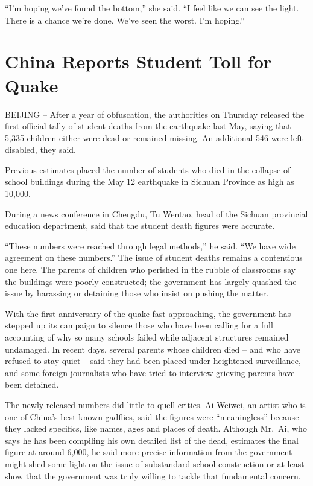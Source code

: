 \documentclass[12pt,a4paper,onecolumn]{article}
\begin{document}
``I'm hoping we've found the bottom,'' she said. ``I feel like we can see the light. There is a
chance we're done. We've seen the worst. I'm hoping.''

\section{China Reports Student Toll for Quake}

BEIJING -- After a year of obfuscation, the authorities on Thursday released the first official
tally of student deaths from the earthquake last May, saying that 5,335 children either were dead or
remained missing. An additional 546 were left disabled, they said.

Previous estimates placed the number of students who died in the collapse of school buildings during
the May 12 earthquake in Sichuan Province as high as 10,000.

During a news conference in Chengdu, Tu Wentao, head of the Sichuan provincial education department,
said that the student death figures were accurate.

``These numbers were reached through legal methods,'' he said. ``We have wide agreement on these
numbers.'' The issue of student deaths remains a contentious one here. The parents of children who
perished in the rubble of classrooms say the buildings were poorly constructed; the government has
largely quashed the issue by harassing or detaining those who insist on pushing the matter.

With the first anniversary of the quake fast approaching, the government has stepped up its campaign
to silence those who have been calling for a full accounting of why so many schools failed while
adjacent structures remained undamaged. In recent days, several parents whose children died -- and
who have refused to stay quiet -- said they had been placed under heightened surveillance, and some
foreign journalists who have tried to interview grieving parents have been detained.

The newly released numbers did little to quell critics. Ai Weiwei, an artist who is one of China's
best-known gadflies, said the figures were ``meaningless'' because they lacked specifics, like
names, ages and places of death. Although Mr.~Ai, who says he has been compiling his own detailed
list of the dead, estimates the final figure at around 6,000, he said more precise information from
the government might shed some light on the issue of substandard school construction or at least
show that the government was truly willing to tackle that fundamental concern.
\end{document}
